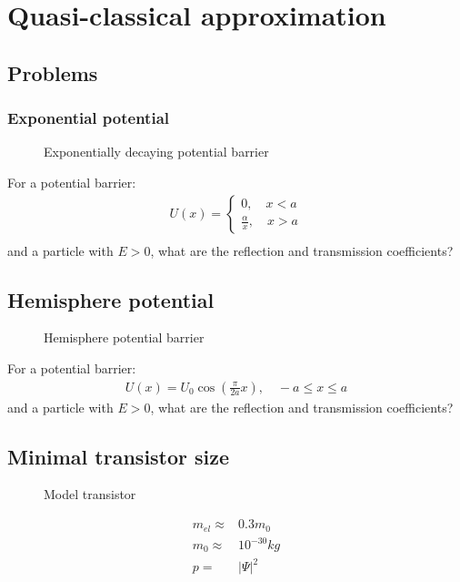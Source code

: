 \section{Quasi-classical approximation}
	\subsection{Problems}
		\subsubsection{Exponential potential}
			\begin{figure}[!h]
				\centering
				
				\caption{Exponentially decaying potential barrier}
			\end{figure}
			For a potential barrier:
			\begin{align}
				U(x) = \left\{ \begin{aligned}
					0,\quad x < a \\
					\frac{\alpha}{x},\quad x > a
				\end{aligned}
				\right. \\
			\end{align}
			and a particle with $E > 0$, what are the reflection and transmission coefficients?
			
		\subsection{Hemisphere potential}
			\begin{figure}[!h]
				\centering
				
				\caption{Hemisphere potential barrier}
			\end{figure}
			For a potential barrier:
			\begin{align}
				U(x) = U_0 \cos(\frac{\pi}{2a}x), \quad -a \leq x \leq a
			\end{align}
			and a particle with $E > 0$, what are the reflection and transmission coefficients?
		\subsection{Minimal transistor size}
			\begin{figure}[!h]
				\centering
				
				\caption{Model transistor}
			\end{figure}
			
			\begin{align}
				m_{el} \approx& 0.3 m_0 \\
				m_0 \approx& 10^{-30}\si{kg} \\
				p =& |\Psi|^2
			\end{align}			
			

